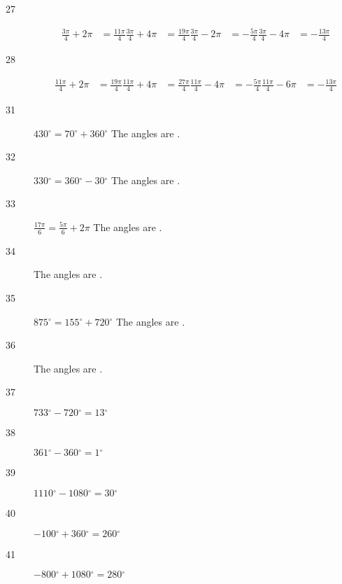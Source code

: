 \documentclass{exam}
\newcommand{\degree}{\ensuremath{^\circ}}
\begin{document}
\begin{description}
      \item[27] 
        \begin{align*}
          \frac{3 \pi}{4} + 2 \pi & = \boxed{ \frac{11 \pi}{4} }
          \frac{3 \pi}{4} + 4 \pi & = \boxed{ \frac{19 \pi}{4} }
          \frac{3 \pi}{4} - 2 \pi & = \boxed{ - \frac{5 \pi}{4} }
          \frac{3 \pi}{4} - 4 \pi & = \boxed{ - \frac{13 \pi}{4} }
        \end{align*}

      \item[28] 
        \begin{align*}
          \frac{11 \pi}{4} + 2 \pi & = \boxed{ \frac{19 \pi}{4} }
          \frac{11 \pi}{4} + 4 \pi & = \boxed{ \frac{27 \pi}{4} }
          \frac{11 \pi}{4} - 4 \pi & = \boxed{ - \frac{5 \pi}{4} }
          \frac{11 \pi}{4} - 6 \pi & = \boxed{ - \frac{13 \pi}{4} }
        \end{align*}

      \item[31] $430 \degree = 70 \degree + 360 \degree$
        The angles are .

      \item[32] $330 \degree = 360 \degree - 30 \degree$
        The angles are .

      \item[33] $\frac{17 \pi}{6} = \frac{5 \pi}{6} + 2 \pi$
        The angles are .

      \item[34] The angles are .

      \item[35] $875 \degree = 155 \degree + 720 \degree$
        The angles are .

      \item[36] The angles are .

      \item[37] $733 \degree - 720 \degree = \boxed{ 13 \degree }$

      \item[38] $361 \degree - 360 \degree = \boxed{ 1 \degree }$

      \item[39] $1110 \degree - 1080 \degree = \boxed{ 30 \degree }$

      \item[40] $-100 \degree + 360 \degree = \boxed{ 260 \degree }$

      \item[41] $-800 \degree + 1080 \degree = \boxed{ 280 \degree }$


\end{description}
\end{document}
